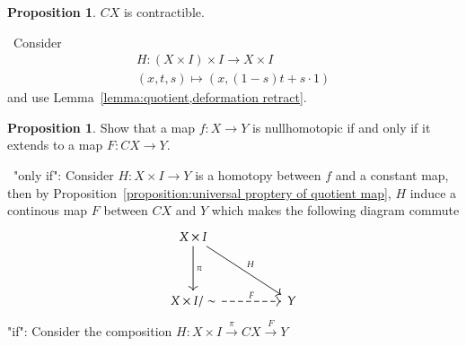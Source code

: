 \documentclass[12pt,a4paper]{book}
\newenvironment{prooff}{{\noindent\it\textcolor{cyan!40!black}{Proof}:}\,}{\par}
\newcommand{\rarr}[1]{\xrightarrow{#1}}
\theoremstyle{definition}
\newtheorem{prop}[defn]{Proposition}
\begin{document}
\begin{prop}
    $CX$ is contractible.
\end{prop}
\begin{prooff}
    Consider
    \begin{align*}
        H:(X\times I)\times I \rightarrow X\times I \\
        (x,t,s)\mapsto (x,(1-s)t+s\cdot 1)
    \end{align*}
    and use Lemma~\ref{lemma:quotient,deformation retract}.
\end{prooff}
\begin{prop}
    Show that a map $f:X\rightarrow Y$ is nullhomotopic if and only if it extends to a map $F:CX\rightarrow Y$.
    \label{proposition:X-Y nulhomotopic iff CX-Y}
\end{prop}
\begin{prooff}
    "only if":
    Consider $H:X\times I\rightarrow Y$ is a homotopy between $f$ and a constant map, then
    by Proposition~\ref{proposition:universal proptery of quotient map}, $H$ induce a continous map $F$ between $CX$ and $Y$
    which makes the following diagram commute
    \[\begin{tikzcd}
            {X\times I} \\
            \\
            {X\times I/\sim} && Y
            \arrow["\pi", from=1-1, to=3-1]
            \arrow["H", from=1-1, to=3-3]
            \arrow["F", dashed, from=3-1, to=3-3]
        \end{tikzcd}\]
    "if": Consider the composition $H:X\times I \rarr{\pi} CX \rarr{F} Y$
\end{prooff}
\end{document}
